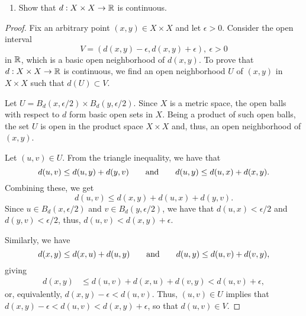 \begin{solution}
    \begin{enumerate}[label={(\alph*)}, align=left, leftmargin=\parindent, listparindent=\parindent, labelwidth=0pt, itemindent=!]
        \item Show that $d: X \times X \rightarrow \mathbb{R}$ is continuous.
    \end{enumerate}
    \begin{proof}
        Fix an arbitrary point $(x, y) \in X \times X$ and let $\epsilon > 0$.
        Consider the open interval
        \begin{equation*}
            V = (d(x, y) - \epsilon, d(x, y) + \epsilon),~ \epsilon > 0
        \end{equation*}
        in $\mathbb{R}$, which is a basic open neighborhood of $d(x, y)$.  
        To prove that $d: X \times X \rightarrow \mathbb{R}$ is continuous, we find an open neighborhood $U$ of $(x, y)$ in $X \times X$ such that $d(U) \subset V$.

        Let $U = B_d(x, \epsilon/2) \times B_d(y, \epsilon/2)$.
        Since $X$ is a metric space, the open balls with respect to $d$ form basic open sets in $X$.
        Being a product of such open balls, the set $U$ is open in the product space $X \times X$ and, thus, an open neighborhood of $(x, y)$.

        Let $(u, v) \in U$.
        From the triangle inequality, we have that
        \begin{equation*}
            d(u, v) \leq d(u, y) + d(y, v)\qquad {\rm and }\qquad d(u, y) \leq d(u, x) + d(x, y).
        \end{equation*}
        Combining these, we get
        \begin{equation*}
            d(u, v) \leq d(x, y) + d(u, x) + d(y, v).
        \end{equation*}
        Since $u \in B_d(x, \epsilon/2)$ and $v \in B_d(y, \epsilon/2)$, we have that $d(u, x) < \epsilon/2$ and $d(y, v) < \epsilon/2$, thus, $d(u, v) < d(x, y) + \epsilon$.

        Similarly, we have
        \begin{equation*}
            d(x, y) \leq d(x, u) + d(u, y)\qquad {\rm and }\qquad d(u, y) \leq d(u, v) + d(v, y),
        \end{equation*}
        giving
        \begin{align*}
            d(x, y) &\leq d(u, v) + d(x, u) + d(v, y) < d(u, v) + \epsilon,
        \end{align*}
        or, equivalently, $d(x, y) - \epsilon < d(u, v)$.
        Thus, $(u, v) \in U$ implies that $d(x, y) - \epsilon < d(u, v) < d(x, y) + \epsilon$, so that $d(u, v) \in V$.


\end{proof}
\end{solution}
